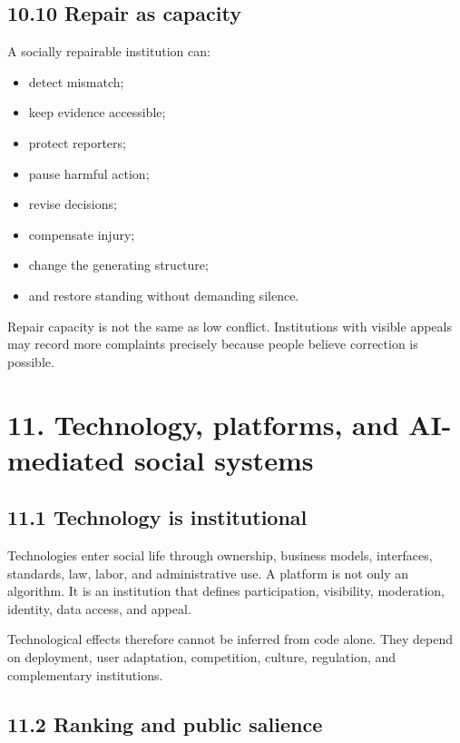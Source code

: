 \documentclass[
  11pt,
]{article}
\providecommand{\tightlist}{%
  \setlength{\itemsep}{0pt}\setlength{\parskip}{0pt}}
\begin{document}
\subsection{10.10 Repair as capacity}\label{repair-as-capacity}

A socially repairable institution can:

\begin{itemize}
\tightlist
\item
  detect mismatch;
\item
  keep evidence accessible;
\item
  protect reporters;
\item
  pause harmful action;
\item
  revise decisions;
\item
  compensate injury;
\item
  change the generating structure;
\item
  and restore standing without demanding silence.
\end{itemize}

Repair capacity is not the same as low conflict. Institutions with
visible appeals may record more complaints precisely because people
believe correction is possible.

\section{11. Technology, platforms, and AI-mediated social
systems}\label{technology-platforms-and-ai-mediated-social-systems}

\subsection{11.1 Technology is
institutional}\label{technology-is-institutional}

Technologies enter social life through ownership, business models,
interfaces, standards, law, labor, and administrative use. A platform is
not only an algorithm. It is an institution that defines participation,
visibility, moderation, identity, data access, and appeal.

Technological effects therefore cannot be inferred from code alone. They
depend on deployment, user adaptation, competition, culture, regulation,
and complementary institutions.

\subsection{11.2 Ranking and public
salience}\label{ranking-and-public-salience}
\end{document}
